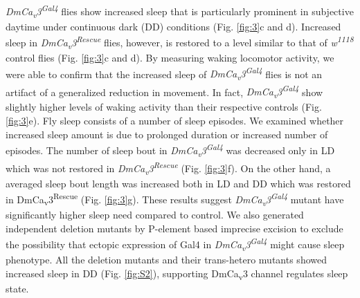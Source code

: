 \emph{DmCa\textsubscript{v}3\textsuperscript{Gal4}} flies show increased sleep that is particularly prominent in subjective daytime under continuous dark (DD) conditions (Fig. \ref{fig:3}c and d).
Increased sleep in \emph{DmCa\textsubscript{v}3\textsuperscript{Rescue}} flies, however, is restored to a level similar to that of \emph{w\textsuperscript{1118}} control flies (Fig. \ref{fig:3}c and d).
By measuring waking locomotor activity, we were able to confirm that the increased sleep of \emph{DmCa\textsubscript{v}3\textsuperscript{Gal4}} flies is not an artifact of a generalized reduction in movement. In fact, \emph{DmCa\textsubscript{v}3\textsuperscript{Gal4}} show slightly higher levels of waking activity than their respective controls (Fig. \ref{fig:3}e).
Fly sleep consists of a number of sleep episodes.
We examined whether increased sleep amount is due to prolonged duration or increased number of episodes.
The number of sleep bout in \emph{DmCa\textsubscript{v}3\textsuperscript{Gal4}} was decreased only in LD which was not restored in \emph{DmCa\textsubscript{v}3\textsuperscript{Rescue}} (Fig. \ref{fig:3}f).
On the other hand, a averaged sleep bout length was increased both in LD and DD which was restored in DmCa\textsubscript{v}3\textsuperscript{Rescue} (Fig. \ref{fig:3}g).
These results suggest \emph{DmCa\textsubscript{v}3\textsuperscript{Gal4}} mutant have significantly higher sleep need compared to control.
We also generated independent deletion mutants by P-element based imprecise excision to exclude the possibility that ectopic expression of Gal4 in \emph{DmCa\textsubscript{v}3\textsuperscript{Gal4}} might cause sleep phenotype.
All the deletion mutants and their trans-hetero mutants showed increased sleep in DD (Fig. \ref{fig:S2}), supporting DmCa\textsubscript{v}3 channel regulates sleep state.
    
  
  
  
